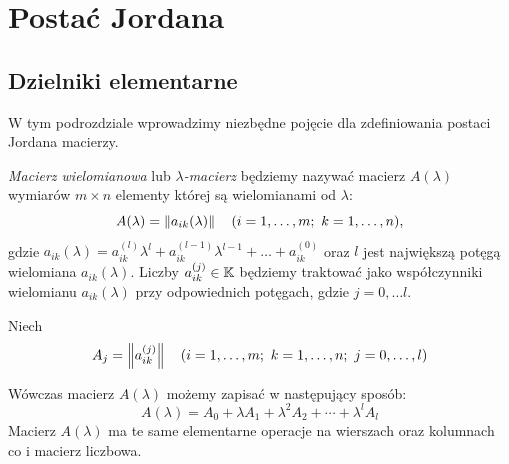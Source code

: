 \chapter{Postać Jordana}

\section{Dzielniki elementarne}
 
W tym podrozdziale wprowadzimy niezbędne pojęcie dla zdefiniowania postaci Jordana macierzy.

\begin{definition}
    \textit{Macierz wielomianowa} lub $\lambda$\textit{-macierz} będziemy nazywać macierz $A(\lambda)$ wymiarów $m \times n$ elementy której są wielomianami od $\lambda$:
    $$A(\lambda) = \left\| a_{ik}(\lambda) \right\| \quad (i = 1, \ldots, m; \ k = 1, \ldots, n),$$
    gdzie $a_{ik}(\lambda) = a_{ik}^{(l)}\lambda^l + a_{ik}^{(l - 1)}\lambda^{l - 1} + \ldots + a_{ik}^{(0)}$ oraz $l$ jest największą potęgą wielomiana $a_{ik}(\lambda)$. Liczby $a_{ik}^{(j)} \in \mathbb{K}$ będziemy traktować jako współczynniki wielomianu $a_{ik}(\lambda)$ przy odpowiednich potęgach, gdzie $j = 0, \ldots l$.
\end{definition}
Niech
$$A_j = \left\| a_{ik}^{(j)} \right\| \quad (i = 1, \ldots, m;\ k = 1, \ldots, n;\ j = 0, \ldots, l)$$

Wówczas macierz $A(\lambda)$ możemy zapisać w następujący sposób:
$$A(\lambda) = A_0 + \lambda A_1 + \lambda^2 A_2 + \cdots + \lambda^l A_l$$
Macierz $A(\lambda)$ ma te same elementarne operacje na wierszach oraz kolumnach co i macierz liczbowa.



